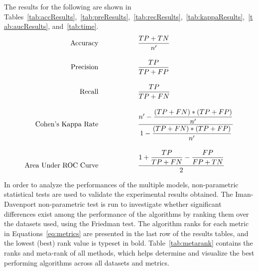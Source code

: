 \documentclass[reqno]{vcuthesis}
\newcommand\tab[1][1cm]{\hspace*{#1}}
\numberwithin{equation}{chapter}
\begin{document}
The results for the following are shown in Tables~\ref{tab:accResults},~\ref{tab:preResults},~\ref{tab:recResults},~\ref{tab:kappaResults},~\ref{tab:aucResults}, and~\ref{tab:time}.
\begin{subequations}
\label{eq:metrics}
\begin{align}
\text{Accuracy} \tab \tab &\dfrac{TP+TN}{n^\prime} \label{eq:accuracy}\\[10pt]
\text{Precision} \tab \tab &\dfrac{TP}{TP+FP} \label{eq:precision}\\[10pt]
\text{Recall} \tab \tab &\dfrac{TP}{TP+FN} \label{eq:recall}\\[10pt]
\text{Cohen's Kappa Rate} \tab \tab &\dfrac{n^\prime - \dfrac{(TP+FN)*(TP+FP)}{n^\prime}}{1 - \dfrac{(TP+FN)*(TP+FP)}{n^\prime}} \label{eq:kappa}\\[10pt]
\text{Area Under ROC Curve} \tab \tab &\frac{1 + \dfrac{TP}{TP+FN} - \dfrac{FP}{FP+TN}}{2} \label{eq:auc}
\end{align}
\end{subequations}

In order to analyze the performances of the multiple models, non-parametric statistical tests are used to validate the experimental results obtained. The Iman-Davenport non-parametric test is run to investigate whether significant differences exist among the performance of the algorithms by ranking them over the datasets used, using the Friedman test. The algorithm ranks for each metric in Equations~\eqref{eq:metrics} are presented in the last row of the results tables, and the lowest (best) rank value is typeset in bold. Table~\ref{tab:metarank} contains the ranks and meta-rank of all methods, which helps determine and visualize the best performing algorithms across all datasets and metrics. 
\end{document}
